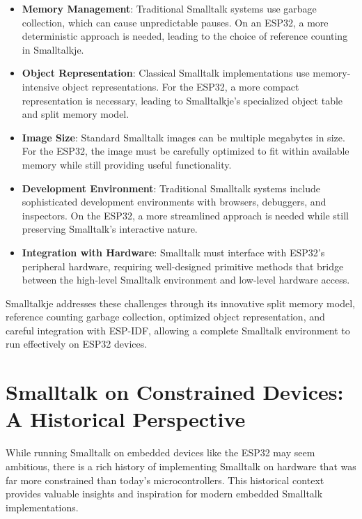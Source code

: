 \documentclass[12pt,a4paper]{report}
\begin{document}
\begin{itemize}
    \item \textbf{Memory Management}: Traditional Smalltalk systems use garbage collection, which can cause unpredictable pauses. On an ESP32, a more deterministic approach is needed, leading to the choice of reference counting in Smalltalkje.
    
    \item \textbf{Object Representation}: Classical Smalltalk implementations use memory-intensive object representations. For the ESP32, a more compact representation is necessary, leading to Smalltalkje's specialized object table and split memory model.
    
    \item \textbf{Image Size}: Standard Smalltalk images can be multiple megabytes in size. For the ESP32, the image must be carefully optimized to fit within available memory while still providing useful functionality.
    
    \item \textbf{Development Environment}: Traditional Smalltalk systems include sophisticated development environments with browsers, debuggers, and inspectors. On the ESP32, a more streamlined approach is needed while still preserving Smalltalk's interactive nature.
    
    \item \textbf{Integration with Hardware}: Smalltalk must interface with ESP32's peripheral hardware, requiring well-designed primitive methods that bridge between the high-level Smalltalk environment and low-level hardware access.
\end{itemize}

Smalltalkje addresses these challenges through its innovative split memory model, reference counting garbage collection, optimized object representation, and careful integration with ESP-IDF, allowing a complete Smalltalk environment to run effectively on ESP32 devices.

\section{Smalltalk on Constrained Devices: A Historical Perspective}

While running Smalltalk on embedded devices like the ESP32 may seem ambitious, there is a rich history of implementing Smalltalk on hardware that was far more constrained than today's microcontrollers. This historical context provides valuable insights and inspiration for modern embedded Smalltalk implementations.
\end{document}
